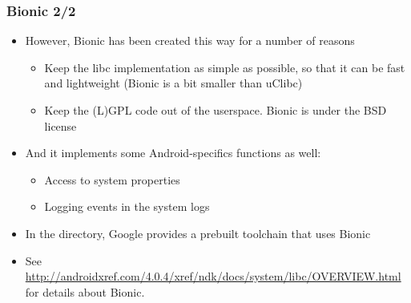 \begin{frame}
  \frametitle{Bionic 2/2}
  \begin{itemize}
  \item However, Bionic has been created this way for a number of
    reasons
    \begin{itemize}
    \item Keep the libc implementation as simple as possible, so that
      it can be fast and lightweight (Bionic is a bit smaller than
      uClibc)
    \item Keep the (L)GPL code out of the userspace. Bionic is under
      the BSD license
    \end{itemize}
  \item And it implements some Android-specifics functions as well:
    \begin{itemize}
    \item Access to system properties
    \item Logging events in the system logs
    \end{itemize}
  \item In the  directory, Google provides a prebuilt toolchain
    that uses Bionic
  \item See
    \url{http://androidxref.com/4.0.4/xref/ndk/docs/system/libc/OVERVIEW.html}
    for details about Bionic.
  \end{itemize}
\end{frame}
